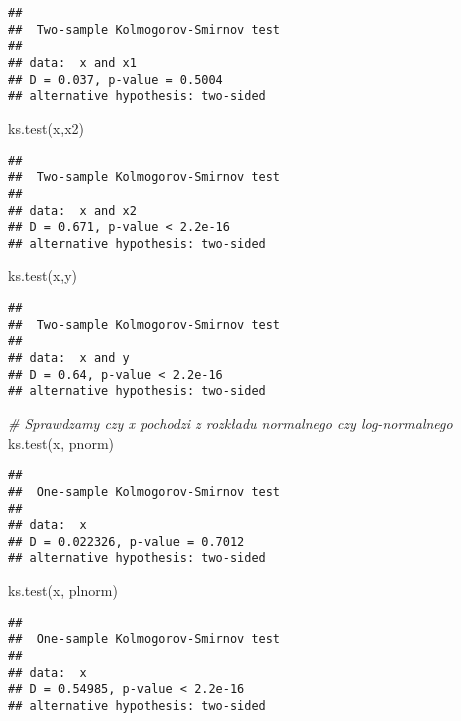 \documentclass[
]{book}
\newenvironment{Shaded}{\begin{snugshade}}{\end{snugshade}}
\newcommand{\CommentTok}[1]{\textcolor[rgb]{0.56,0.35,0.01}{\textit{#1}}}
\newcommand{\FunctionTok}[1]{\textcolor[rgb]{0.00,0.00,0.00}{#1}}
\newcommand{\NormalTok}[1]{#1}
\begin{document}
\begin{verbatim}
## 
##  Two-sample Kolmogorov-Smirnov test
## 
## data:  x and x1
## D = 0.037, p-value = 0.5004
## alternative hypothesis: two-sided
\end{verbatim}

\begin{Shaded}
\begin{Highlighting}[]
\FunctionTok{ks.test}\NormalTok{(x,x2)}
\end{Highlighting}
\end{Shaded}

\begin{verbatim}
## 
##  Two-sample Kolmogorov-Smirnov test
## 
## data:  x and x2
## D = 0.671, p-value < 2.2e-16
## alternative hypothesis: two-sided
\end{verbatim}

\begin{Shaded}
\begin{Highlighting}[]
\FunctionTok{ks.test}\NormalTok{(x,y)}
\end{Highlighting}
\end{Shaded}

\begin{verbatim}
## 
##  Two-sample Kolmogorov-Smirnov test
## 
## data:  x and y
## D = 0.64, p-value < 2.2e-16
## alternative hypothesis: two-sided
\end{verbatim}

\begin{Shaded}
\begin{Highlighting}[]
\CommentTok{\# Sprawdzamy czy x pochodzi z rozkładu normalnego czy log{-}normalnego}
\FunctionTok{ks.test}\NormalTok{(x, pnorm)}
\end{Highlighting}
\end{Shaded}

\begin{verbatim}
## 
##  One-sample Kolmogorov-Smirnov test
## 
## data:  x
## D = 0.022326, p-value = 0.7012
## alternative hypothesis: two-sided
\end{verbatim}

\begin{Shaded}
\begin{Highlighting}[]
\FunctionTok{ks.test}\NormalTok{(x, plnorm)}
\end{Highlighting}
\end{Shaded}

\begin{verbatim}
## 
##  One-sample Kolmogorov-Smirnov test
## 
## data:  x
## D = 0.54985, p-value < 2.2e-16
## alternative hypothesis: two-sided
\end{verbatim}
\end{document}
